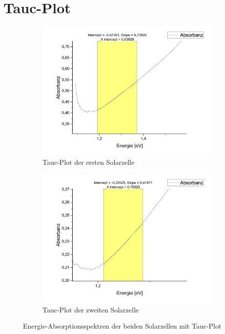 \documentclass[12pt,a4paper,ngerman]{report}
\begin{document}
	\section{Tauc-Plot}
	\begin{figure}[ht]
		\centering
		\begin{subfigure}[b]{0.45\textwidth}
			\centering
			\includegraphics[width=\textwidth]{bilder/TaucP1.pdf}
			\caption{Tauc-Plot der ersten Solarzelle}
			\label{fig:TaucP1}
		\end{subfigure}
		\hfill
		\begin{subfigure}[b]{0.45\textwidth}
			\centering
			\includegraphics[width=\textwidth]{bilder/TaucP2.pdf}
			\caption{Tauc-Plot der zweiten Solarzelle}
			\label{fig:TaucP2}
		\end{subfigure}
		\caption[Tauc-Plots]{Energie-Absorptionsspektren der beiden Solarzellen mit Tauc-Plot}
		\label{fig:AbsP1P2Combined}
	\end{figure}
\end{document}

